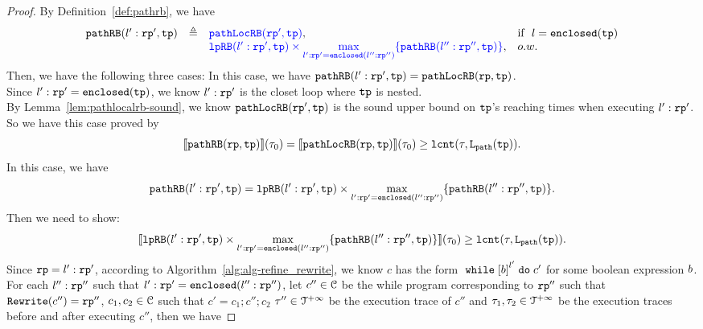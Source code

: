 \begin{proof}
By Definition~\ref{def:pathrb}, we have 
\[  
  \begin{array}{rcll}
  \inoutB(l': \rprog', \tpath) & \triangleq & 
  \highlight{\outinB(\rprog', \tpath)}, & \text{if }~ l = \kw{enclosed}(\tpath)
  \\ &  & 
  \highlight{
    \lpchB(l':\rprog', \tpath )
  \times \max\limits_{l': \rprog' = \kw{enclosed}(l'':\rprog'')}
  \{\inoutB(l'':\rprog'', \tpath)\} }, & o.w.
  \end{array}
\]
%
Then, we have the following three cases:
In this case, we have $\mathtt{pathRB}(l': \mathtt{rp}', \mathtt{tp}) = {\mathtt{pathLocRB}(\mathtt{rp}, \mathtt{tp})}$.
\\
Since $l': \mathtt{rp}' = \mathtt{enclosed}(\mathtt{tp})$, we know $l': \mathtt{rp}'$ is the closet loop where $\mathtt{tp}$ is nested.
\\
By Lemma~\ref{lem:pathlocalrb-sound}, we know $\mathtt{pathLocRB}(\mathtt{rp}', \mathtt{tp})$ is the
sound upper bound on $\mathtt{tp}$'s reaching times when executing $l': \mathtt{rp}'$. 
\\
So we have this case proved by
\[
  \llbracket \mathtt{pathRB}(\mathtt{rp}, \mathtt{tp}) \rrbracket(\mathtt{\tau}_0) = \llbracket \mathtt{pathLocRB}(\mathtt{rp}, \mathtt{tp}) \rrbracket(\mathtt{\tau}_0) \geq \mathtt{lcnt}(\mathtt{\tau}, \mathtt{L}_{\mathtt{path}}(\mathtt{tp})).
\]
%
In this case, we have 
\[
  \mathtt{pathRB}(l': \mathtt{rp}', \mathtt{tp}) = \mathtt{lpRB}(l':\mathtt{rp}', \mathtt{tp} )
  \times \max\limits_{l': \mathtt{rp}' = \mathtt{enclosed}(l'':\mathtt{rp}'')}
  \{\mathtt{pathRB}(l'':\mathtt{rp}'', \mathtt{tp})\}.
\]
Then we need to show:
\[
  \llbracket \mathtt{lpRB}(l':\mathtt{rp}', \mathtt{tp} )
  \times \max\limits_{l': \mathtt{rp}' = \mathtt{enclosed}(l'':\mathtt{rp}'')}
  \{\mathtt{pathRB}(l'':\mathtt{rp}'', \mathtt{tp})\} \rrbracket(\mathtt{\tau}_0) 
  \geq \mathtt{lcnt}(\mathtt{\tau}, \mathtt{L}_{\mathtt{path}}(\mathtt{tp})).
  \]
%
Since $\mathtt{rp} = l': \mathtt{rp}'$, according to Algorithm~\ref{alg:alg-refine_rewrite}, we know $c$ has the form
$\ewhile \clabel{\bexpr}^{l'} \edo c'$ for some boolean expression $b$.
\\
For each $l'':\mathtt{rp}''$ such that $l': \mathtt{rp}' = \mathtt{enclosed}(l'':\mathtt{rp}'')$, 
let $c''\in \mathcal{C}$ be the while program corresponding to $\mathtt{rp}''$ such that $\mathtt{Rewrite}(c'') = \mathtt{rp}''$,
$c_1, c_2 \in \mathcal{C}$ such that $c' = c_1; c''; c_2$
$\mathtt{\tau}'' \in \mathcal{T}^{+\infty}$ be the execution trace of $c''$ and $\mathtt{\tau}_1, \mathtt{\tau}_2 \in \mathcal{T}^{+\infty}$ be the execution traces before and after executing $c''$, then we have

\end{proof}
